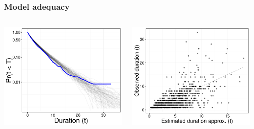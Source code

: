 \documentclass{beamer}
\begin{document}
\begin{frame}
  \frametitle{Model adequacy}
  \begin{columns}
    \begin{column}{0.5\textwidth}
      \begin{center}
        \includegraphics[width=\textwidth,height=0.8\textheight,keepaspectratio=true]{figure/survival_curves}
      \end{center}
    \end{column}
    \begin{column}{0.5\textwidth}
      \begin{center}
        \includegraphics[width=\textwidth,height=0.8\textheight,keepaspectratio=true]{figure/shotgun}
      \end{center}
    \end{column}
  \end{columns}
\end{frame}
\end{document}
